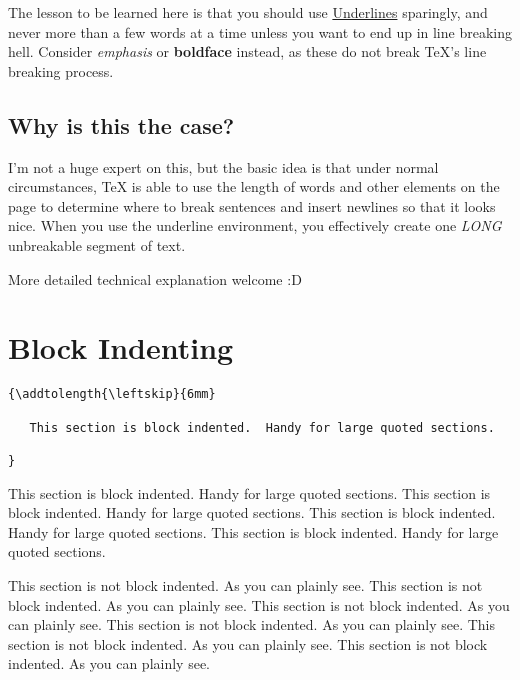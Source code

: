 \documentclass[11pt]{article}
\begin{document}
The lesson to be learned here is that you should use \underline{Underlines} sparingly, and never more than a few words at a time unless you want to end up in line breaking hell. Consider \emph{emphasis} or \textbf{boldface} instead, as these do not break TeX's line breaking process.

\subsection{Why is this the case?}

I'm not a huge expert on this, but the basic idea is that under normal circumstances, TeX is able to use the length of words and other elements on the page to determine where to break sentences and insert newlines so that it looks nice.  When you use the underline environment, you effectively create one \emph{LONG} unbreakable segment of text.

More detailed technical explanation welcome :D

\section{Block Indenting}

\begin{verbatim}
{\addtolength{\leftskip}{6mm}

   This section is block indented.  Handy for large quoted sections.

}
\end{verbatim}

{\addtolength{\leftskip}{6mm}

   This section is block indented.  Handy for large quoted sections.
   This section is block indented.  Handy for large quoted sections.
   This section is block indented.  Handy for large quoted sections.
   This section is block indented.  Handy for large quoted sections.

}

\vspace{12pt}
This section is not block indented.  As you can plainly see.
This section is not block indented.  As you can plainly see.
This section is not block indented.  As you can plainly see.
This section is not block indented.  As you can plainly see.
This section is not block indented.  As you can plainly see.
This section is not block indented.  As you can plainly see.
\end{document}
